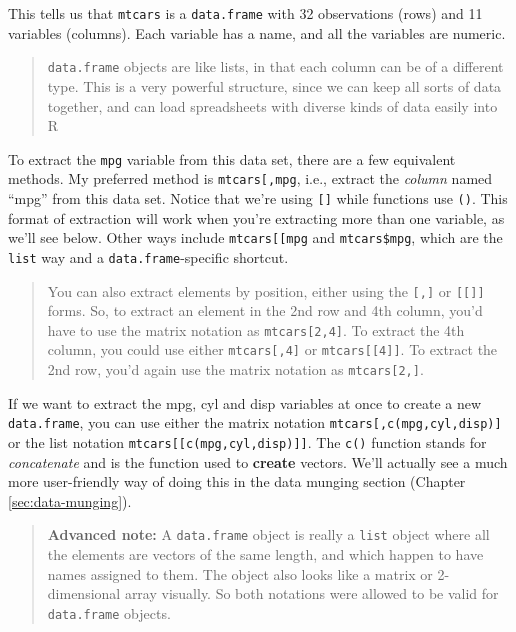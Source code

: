 \documentclass[12pt,letterpaperpaper,openany]{book}
\begin{document}
This tells us that \texttt{mtcars} is a \texttt{data.frame} with 32 observations (rows) and 11 variables (columns).
Each variable has a name, and all the variables are numeric.

\begin{quote}
\texttt{data.frame} objects are like lists, in that each column can be of a different type. This is a very
powerful structure, since we can keep all sorts of data together, and can load spreadsheets with
diverse kinds of data easily into R
\end{quote}

To extract the \texttt{mpg} variable from this data set, there are a few equivalent methods. My preferred method is \texttt{mtcars{[},\textquotesingle{}mpg\textquotesingle{}{]}}, i.e., extract the \emph{column} named ``mpg'' from this data set. Notice that we're using \texttt{{[}{]}} while functions use \texttt{()}. This format of extraction will work when you're extracting more than one variable, as we'll see below. Other ways include \texttt{mtcars{[}{[}\textquotesingle{}mpg\textquotesingle{}{]}{]}} and \texttt{mtcars\$mpg}, which are
the \texttt{list} way and a \texttt{data.frame}-specific shortcut.

\begin{quote}
You can also extract elements by position, either using the \texttt{{[},{]}} or \texttt{{[}{[}{]}{]}} forms. So, to extract an
element in the 2nd row and 4th column, you'd have to use the matrix notation as \texttt{mtcars{[}2,4{]}}. To
extract the 4th column, you could use either \texttt{mtcars{[},4{]}} or \texttt{mtcars{[}{[}4{]}{]}}. To extract the 2nd row,
you'd again use the matrix notation as \texttt{mtcars{[}2,{]}}.
\end{quote}

If we want to extract the mpg, cyl and disp variables at once to create a new \texttt{data.frame}, you can
use either the matrix notation \texttt{mtcars{[},c(\textquotesingle{}mpg\textquotesingle{},\textquotesingle{}cyl\textquotesingle{},\textquotesingle{}disp\textquotesingle{}){]}} or the list notation \texttt{mtcars{[}{[}c(\textquotesingle{}mpg\textquotesingle{},\textquotesingle{}cyl\textquotesingle{},\textquotesingle{}disp\textquotesingle{}){]}{]}}. The \texttt{c()} function stands for \emph{concatenate} and is the function used to \textbf{create} vectors. We'll actually see a much more user-friendly way of doing this in the data munging section (Chapter \ref{sec:data-munging}).

\begin{quote}
\textbf{Advanced note:} A \texttt{data.frame} object is really a \texttt{list} object where all the elements are vectors
of the same length, and which happen to have names assigned to them. The object also looks like a matrix
or 2-dimensional array visually. So both notations were allowed to be valid for \texttt{data.frame} objects.
\end{quote}
\end{document}
